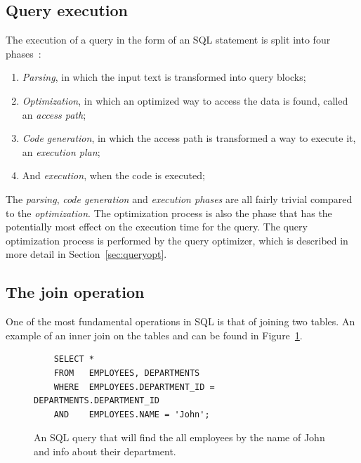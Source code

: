 \subsection{Query execution}
The execution of a query in the form of an SQL statement is split into four
phases~\cite{selinger_1979_access_apsiardms}:
\begin{enumerate}
\item \textit{Parsing}, in which the input text is transformed into query
  blocks;
\item \textit{Optimization}, in which an optimized way to access the data is
  found, called an \textit{access path};
\item \textit{Code generation}, in which the access path is transformed a way to
  execute it, an \textit{execution plan};
\item And \textit{execution}, when the code is executed;
\end{enumerate}

The \textit{parsing}, \textit{code generation} and \textit{execution phases} are
all fairly trivial compared to the \textit{optimization}. The optimization
process is also the phase that has the potentially most effect on the execution
time for the query. The query optimization process is performed by the query
optimizer, which is described in more detail in Section~\ref{sec:queryopt}.

\subsection{The join operation}
One of the most fundamental operations in SQL is that of joining two tables. An
example of an inner join on the tables  and  can
be found in Figure~\ref{fig:sql:joinop}.

\begin{figure}[ht]
  \begin{verbatim}
    SELECT *
    FROM   EMPLOYEES, DEPARTMENTS
    WHERE  EMPLOYEES.DEPARTMENT_ID = DEPARTMENTS.DEPARTMENT_ID
    AND    EMPLOYEES.NAME = 'John';
  \end{verbatim}
  \caption[An example of an SQL query]{An SQL query that will find the all
    employees by the name of John and info about their
    department.}\label{fig:sql:joinop}
\end{figure}

